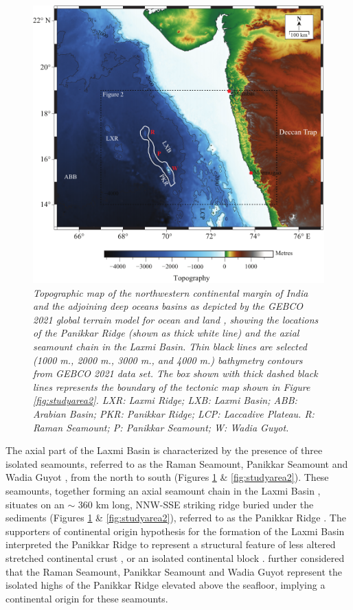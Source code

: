 \documentclass[twocolumn]{article}
\begin{document}
\begin{figure}[!htb]
	\centering
	\includegraphics[width=0.85\linewidth]{studyarea-bathy.pdf}
	\caption{
		\textsl{	Topographic map of the northwestern continental margin of India and the adjoining deep oceans basins as depicted by the GEBCO 2021 global terrain model for ocean and land \citep{GEBCO_Compilation_Group2021}, showing the locations of the Panikkar Ridge (shown as thick white line) and the axial seamount chain in the Laxmi Basin. Thin black lines are selected (1000 m., 2000 m., 3000 m., and 4000 m.) bathymetry contours from GEBCO 2021 data set. The box shown with thick dashed black lines represents the boundary of the tectonic map shown in Figure \ref{fig:studyarea2}. LXR: Laxmi Ridge; LXB: Laxmi Basin; ABB: Arabian Basin; PKR: Panikkar Ridge; LCP: Laccadive Plateau. R: Raman Seamount; P: Panikkar Seamount; W: Wadia Guyot.}
	}
	\label{fig:studyarea}
\end{figure} 
The axial part of the Laxmi Basin is characterized by the presence of three isolated seamounts, referred to as the Raman Seamount, Panikkar Seamount and Wadia Guyot \citep{Bhattacharya1994b}, from the north to south (Figures \ref{fig:studyarea} \& \ref{fig:studyarea2}). These seamounts, together forming an axial seamount chain in the Laxmi Basin \citep{Bhattacharya1994b}, situates on an {$\sim$} 360 km long, NNW-SSE striking ridge buried under the sediments (Figures \ref{fig:studyarea} \& \ref{fig:studyarea2}), referred to as the Panikkar Ridge \citep{Gopala_Rao1992}. The supporters of continental origin hypothesis for the formation of the Laxmi Basin interpreted the Panikkar Ridge to represent a structural feature of less altered stretched continental crust \citep{Krishna2006}, or an isolated continental block \citep{Geoffroy2020}. \cite{Krishna2006} further considered that the Raman Seamount, Panikkar Seamount and Wadia Guyot represent the isolated highs of the Panikkar Ridge elevated above the seafloor, implying a continental origin for these seamounts.
\end{document}
